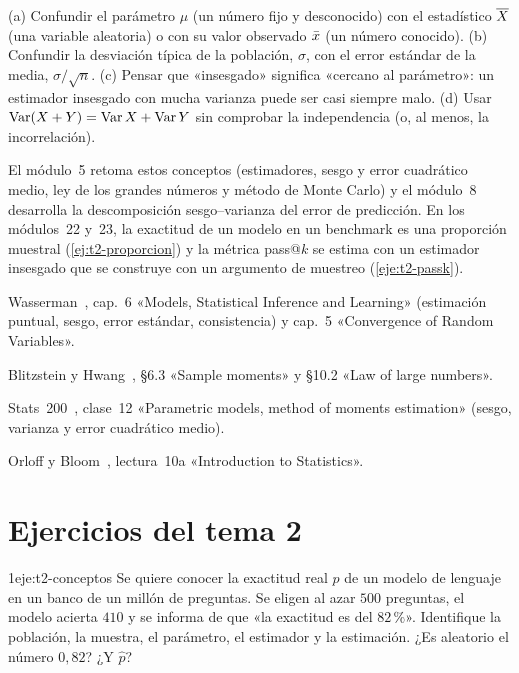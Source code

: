 \begin{observacion}\label{obs:t2-errores}
(a) Confundir el parámetro $\mu$ (un número fijo y desconocido) con el estadístico $\overline{X}$ (una variable aleatoria) o con su valor observado $\bar{x}$ (un número conocido).
(b) Confundir la desviación típica de la población, $\sigma$, con el error estándar de la media, $\sigma/\sqrt n$.
(c) Pensar que «insesgado» significa «cercano al parámetro»: un estimador insesgado con mucha varianza puede ser casi siempre malo.
(d) Usar $\operatorname{Var}(X+Y)=\operatorname{Var} X+\operatorname{Var} Y$ sin comprobar la independencia (o, al menos, la incorrelación).
\end{observacion}

\begin{observacion}
El módulo~5 retoma estos conceptos (estimadores, sesgo y error cuadrático medio, ley de los grandes números y método de Monte Carlo) y el módulo~8 desarrolla la descomposición sesgo--varianza del error de predicción. En los módulos~22 y~23, la exactitud de un modelo en un benchmark es una proporción muestral (\cref{ej:t2-proporcion}) y la métrica pass@$k$ se estima con un estimador insesgado que se construye con un argumento de muestreo (\cref{eje:t2-passk}).
\end{observacion}

\begin{lecturas}
\item Wasserman~\cite{wasserman}, cap.~6 «Models, Statistical Inference and Learning» (estimación puntual, sesgo, error estándar, consistencia) y cap.~5 «Convergence of Random Variables».
\item Blitzstein y Hwang~\cite{bh}, §6.3 «Sample moments» y §10.2 «Law of large numbers».
\item Stats~200~\cite{stats200}, clase~12 «Parametric models, method of moments estimation» (sesgo, varianza y error cuadrático medio).
\item Orloff y Bloom~\cite{mit1805}, lectura~10a «Introduction to Statistics».
\end{lecturas}

\section*{Ejercicios del tema 2}

\begin{ejercicio}{1}{eje:t2-conceptos}
Se quiere conocer la exactitud real $p$ de un modelo de lenguaje en un banco de un millón de preguntas. Se eligen al azar $500$ preguntas, el modelo acierta $410$ y se informa de que «la exactitud es del $82\,\%$». Identifique la población, la muestra, el parámetro, el estimador y la estimación. ¿Es aleatorio el número $0{,}82$? ¿Y $\widehat p$?
\end{ejercicio}

